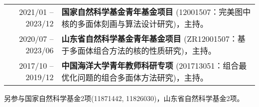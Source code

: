 %
%



 \begin{tabular}{rl}	
	2021/01 -- 2023/12  & \textbf{国家自然科学基金青年基金项目} (12001507：完美图中核的多面体刻画与算法设计研究)，主持。\\
	2020/07 -- 2023/06  & \textbf{山东省自然科学基金青年基金项目} (ZR12001507：基于多面体组合方法的核的性质研究)，主持。\\
	2017/10 -- 2019/12 	&  \textbf{中国海洋大学青年教师科研专项} (201713051：组合最优化问题的组合多面体方法研究)，主持。
\end{tabular}

另参与国家自然科学基金2项(11871442, 11826030)，山东省自然科学基金2项。